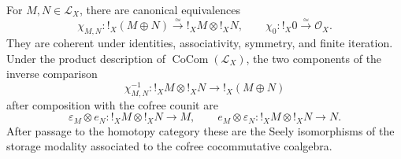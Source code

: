 \begin{proposition}
\label{prop:tangent-seely-equivalences}
For \(M,N\in\mathcal L_X\), there are canonical equivalences
\[
    \chi_{M,N}:!_X(M\oplus N)
    \xrightarrow{\simeq}
    !_XM\otimes !_XN,
    \qquad
    \chi_0:!_X0\xrightarrow{\simeq}\mathcal O_X.
\]
They are coherent under identities, associativity, symmetry, and finite
iteration. Under the product description of
\(\operatorname{CoCom}(\mathcal L_X)\), the two components of the inverse
comparison
\[
    \chi^{-1}_{M,N}:!_XM\otimes !_XN\longrightarrow !_X(M\oplus N)
\]
after composition with the cofree counit are
\[
    \varepsilon_M\otimes e_N:
    !_XM\otimes !_XN\longrightarrow M,
    \qquad
    e_M\otimes\varepsilon_N:
    !_XM\otimes !_XN\longrightarrow N.
\]
After passage to the homotopy category these are the Seely isomorphisms of the
storage modality associated to the cofree cocommutative coalgebra.
\end{proposition}

